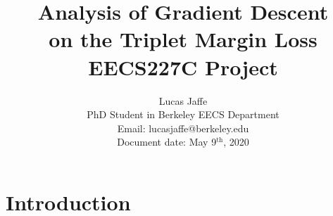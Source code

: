 \documentclass[11pt]{article}
\begin{document}
\author{Lucas Jaffe \\ PhD Student in Berkeley EECS Department \\ Email: lucasjaffe@berkeley.edu \\ Document date: May 9$^{\textrm{th}}$, 2020}

\title{
    Analysis of Gradient Descent \\ on the Triplet Margin Loss \\
    \large EECS227C Project
    }
\maketitle

\medskip




\section{Introduction}
\end{document}
